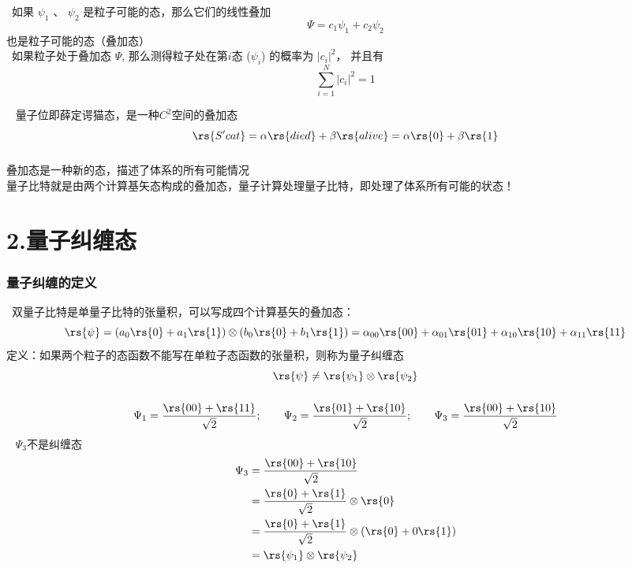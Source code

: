 \begin{frame} 
    \frametitle{}
    \begin{tcolorbox4}[态叠加原理]
    {\Bullet}~如果 $\psi_1$ 、 $\psi_2$ 是粒子可能的态，那么它们的线性叠加
        $$ \Psi=c_1 \psi_1+ c_2\psi_2 $$
    也是粒子可能的态（叠加态）\\   
    {\Bullet}~如果粒子处于叠加态 $\Psi$,  
    那么测得粒子处在第$i$态 ($\psi_i$) 的概率为 $|c_i |^2$， 
    并且有  $$\sum_{i=1}^{N} |c_i|^2 =1$$
    \end{tcolorbox4}
    \Tips~ 量子位即薛定谔猫态，是一种$C^2$空间的叠加态
    \[\rs{S'cat}=\alpha\rs{died}+\beta\rs{alive} = \alpha\rs{0}+\beta\rs{1}\]
\end{frame} 

\begin{frame} 
    \frametitle{}
    {\Bullet} 叠加态是一种新的态，描述了体系的所有可能情况\\ \vspace{0.6em}
    {\Bullet} 量子比特就是由两个计算基矢态构成的叠加态，量子计算处理量子比特，即处理了体系所有可能的状态！
\end{frame} 

\section{2.量子纠缠态}

\begin{frame} 
    \frametitle{量子纠缠的定义}
    {\Bullet} ~双量子比特是单量子比特的张量积，可以写成四个计算基矢的叠加态：
    \[\rs{\psi} =(a_0\rs{0}+a_1\rs{1})\otimes (b_0\rs{0}+b_1\rs{1})=\alpha_{00}\rs{00}+\alpha_{01}\rs{01}+\alpha_{10}\rs{10}+\alpha_{11}\rs{11}\]
    {\Bullet} 定义：如果两个粒子的态函数不能写在单粒子态函数的张量积，则称为量子纠缠态
    \[\rs{\psi} \neq \rs{\psi_{1}} \otimes \rs{\psi_{2}} \]
\end{frame} 

\begin{frame} 
    \frametitle{}
    \例 [试确定下列态哪些是纠缠态]{}
    {\[ \Psi_1=\frac{\rs{00}+\rs{11}}{\sqrt{2}}; \qquad \Psi_2=\frac{\rs{01}+\rs{10}}{\sqrt{2}} ; \qquad \Psi_3=\frac{\rs{00}+\rs{10}}{\sqrt{2}} \]}
    \解~ $\Psi_3$不是纠缠态
    \[\begin{aligned}
        \Psi_3 &= \frac{\rs{00}+\rs{10}}{\sqrt{2}} \\
        &= \frac{\rs{0}+\rs{1}}{\sqrt{2}}\otimes \rs{0} \\
        &= \frac{\rs{0}+\rs{1}}{\sqrt{2}}\otimes (\rs{0}+0\rs{1}) \\
        &= \rs{\psi_{1}} \otimes \rs{\psi_{2}} 
    \end{aligned}\] 
\end{frame} 

